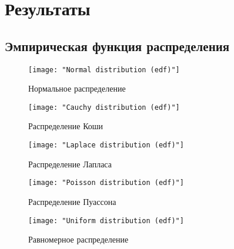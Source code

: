 \documentclass[12pt,a4paper]{article}
\begin{document}
	\section{Результаты}
	\subsection{Эмпирическая функция распределения}
	\begin{center}
		\begin{figure}[h!]
			\texttt{[image: "Normal distribution (edf)"]} 
			\caption[Нормальное распределение]{Нормальное распределение}
		\end{figure}
		
		\begin{figure}[h!]
			\texttt{[image: "Cauchy distribution (edf)"]}
			\caption[Распределение Коши]{Распределение Коши}
		\end{figure}
	
		\begin{figure}[h!]
			\texttt{[image: "Laplace distribution (edf)"]}
			\caption[Распределение Лапласа]{Распределение Лапласа}
		\end{figure}
		
		\begin{figure}[h!]
			\texttt{[image: "Poisson distribution (edf)"]}
			\caption[Распределение Пуассона]{Распределение Пуассона}
		\end{figure}
	
		\begin{figure}[h!]			
			\texttt{[image: "Uniform distribution (edf)"]}
			\caption[Равномерное распределение]{Равномерное распределение}
		\end{figure}
	\end{center}
	
	\newpage
\end{document}
